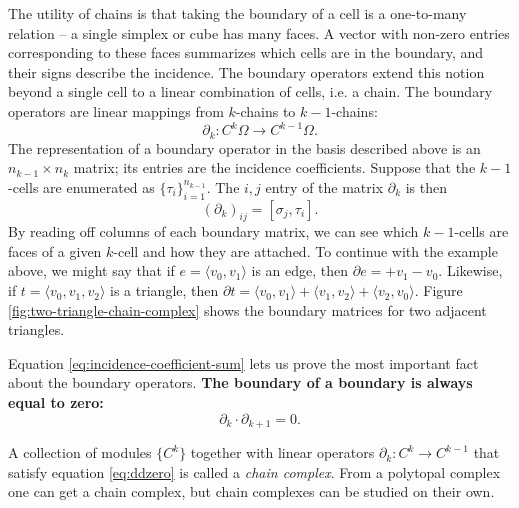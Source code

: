 \documentclass[twocolumn,leqno,twocolumn]{article}
\begin{document}
The utility of chains is that taking the boundary of a cell is a one-to-many relation -- a single simplex or cube has many faces.
A vector with non-zero entries corresponding to these faces summarizes which cells are in the boundary, and their signs describe the incidence.
The boundary operators extend this notion beyond a single cell to a linear combination of cells, i.e. a chain.
The boundary operators are linear mappings from $k$-chains to $k - 1$-chains:
\begin{equation}
    \partial_k : C^k\Omega \to C^{k - 1}\Omega.
\end{equation}
The representation of a boundary operator in the basis described above is an $n_{k - 1} \times n_k$ matrix; its entries are the incidence coefficients.
Suppose that the $k - 1$-cells are enumerated as $\{\tau_i\}_{i = 1}^{n_{k - 1}}$.
The $i, j$ entry of the matrix $\partial_k$ is then
\begin{equation}
    (\partial_k)_{ij} = [\sigma_j, \tau_i].
\end{equation}
By reading off columns of each boundary matrix, we can see which $k - 1$-cells are faces of a given $k$-cell and how they are attached.
To continue with the example above, we might say that if $e = \langle v_0, v_1\rangle$ is an edge, then $\partial e = +v_1 - v_0$.
Likewise, if $t = \langle v_0, v_1, v_2\rangle$ is a triangle, then $\partial t = \langle v_0, v_1\rangle + \langle v_1, v_2\rangle + \langle v_2, v_0\rangle$.
Figure \ref{fig:two-triangle-chain-complex} shows the boundary matrices for two adjacent triangles.

Equation \eqref{eq:incidence-coefficient-sum} lets us prove the most important fact about the boundary operators.
\textbf{The boundary of a boundary is always equal to zero:}
\begin{equation}
    \partial_k\cdot\partial_{k + 1} = 0.
    \label{eq:ddzero}
\end{equation}

A collection of modules $\{C^k\}$ together with linear operators $\partial_k : C^k \to C^{k - 1}$ that satisfy equation \eqref{eq:ddzero} is called a \emph{chain complex}.
From a polytopal complex one can get a chain complex, but chain complexes can be studied on their own.
\end{document}
